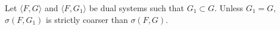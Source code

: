 Let $\langle F, G \rangle$ and $\langle F, G_1 \rangle$ be dual systems such that $G_1 \subset G$. Unless $G_1 = G$, $\sigma(F, G_1)$ is strictly coarser than $\sigma(F, G)$.
